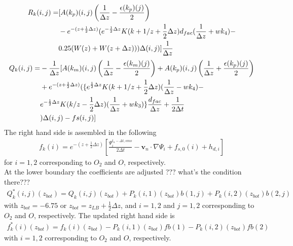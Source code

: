 %
\begin{align}
  R_k(i,j) = & [A(k_p)(i,j)
   \left(\frac{1}{\Delta z} - \frac{\epsilon(k_p)(j)}{2} \right)
      \notag \\
  & - e^{-(z+\frac{1}{2}\Delta z)}( e^{-\frac{1}{2}\Delta z}K(k+1/z+\frac{1}{2}\Delta z)d_{fac}
  (\frac{1}{\Delta z}+wk_4) -  \notag \\
  &  0.25 (W(z)+W(z+\Delta z))) \Delta(i,j)] \frac{1}{\Delta z}
\end{align}
%
\begin{align}
  Q_k(i,j) = & - \frac{1}{\Delta z}[A(k_m)(i,j)
   \left(\frac{1}{\Delta z} - \frac{\epsilon(k_m)(j)}{2} \right) +
   A(k_p)(i,j)
   \left(\frac{1}{\Delta z} + \frac{\epsilon(k_p)(j)}{2} \right)
      \notag \\
  & + e^{-(z+\frac{1}{2}\Delta z)}( \{e^{\frac{1}{2}\Delta z}K(k+1/z+\frac{1}{2}\Delta z)
  (\frac{1}{\Delta z}-wk_4) -  \notag \\
  & e^{-\frac{1}{2}\Delta z}K(k/z-\frac{1}{2}\Delta z)
  (\frac{1}{\Delta z}+wk_3) \}\frac{d_{fac}}{\Delta z} + \frac{1}{2\Delta t}\notag \\
  &) \Delta(i,j) - fs(i,j)]
\end{align}
%
The right hand side is assembled in the following
%
\begin{align}
  f_k(i) =e^{-(z+\frac{1}{2}\Delta z)}[ \frac{\Psi_i^{t_n-\Delta t,smo}}{2 \Delta t}
     -\mathbf{v}_n\cdot \nabla \Psi_i + f_{s,0}(i) + h_{d,i}]
\end{align}
%
for $i = 1,2$ corresponding to $O_2$ and $O$, respectively. \\

At the lower boundary the coefficients are adjusted ??? what's the
condition there???
%
%
\begin{align}
 Q_k^*(i,j)(z_{bot}) = Q_k(i,j)(z_{bot}) +P_k(i,1)(z_{bot})b(1,j) +
      P_k(i,2)(z_{bot})b(2,j)
\end{align}
%
with $z_{bot} = -6.75$ or $z_{bot} = z_{LB}+ \frac{1}{2}\Delta z$,
and $i = 1, 2$ and $j=1, 2$ corresponding to $O_2$ and $O$,
respectively. The updated right hand side is
%
\begin{align}
 f_k^*(i)(z_{bot}) = f_k(i)(z_{bot}) -P_k(i,1)(z_{bot})fb(1) -
      P_k(i,2)(z_{bot})fb(2)
\end{align}
%
with $i = 1, 2$ corresponding to $O_2$ and $O$, respectively. \\

